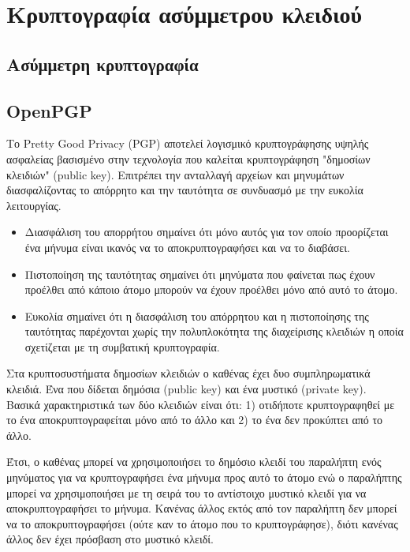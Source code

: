 \section{Κρυπτογραφία ασύμμετρου κλειδιού}

\subsection{Ασύμμετρη κρυπτογραφία}


\subsection{OpenPGP}

Το Pretty Good Privacy (PGP) αποτελεί λογισμικό κρυπτογράφησης υψηλής ασφαλείας βασισμένο στην τεχνολογία που καλείται κρυπτογράφηση "δημοσίων κλειδιών" (public key). Επιτρέπει την ανταλλαγή αρχείων και μηνυμάτων διασφαλίζοντας το απόρρητο και την ταυτότητα σε συνδυασμό με την ευκολία λειτουργίας.

\begin{itemize}
    \item Διασφάλιση του απορρήτου σημαίνει ότι μόνο αυτός για τον οποίο προορίζεται ένα μήνυμα είναι ικανός να το αποκρυπτογραφήσει και να το διαβάσει.
    \item Πιστοποίηση της ταυτότητας σημαίνει ότι μηνύματα που φαίνεται πως έχουν προέλθει από κάποιο άτομο μπορούν να έχουν προέλθει μόνο από αυτό το άτομο.
    \item Ευκολία σημαίνει ότι η διασφάλιση του απόρρητου και η πιστοποίησης της ταυτότητας παρέχονται χωρίς την πολυπλοκότητα της διαχείρισης κλειδιών η οποία σχετίζεται με τη συμβατική κρυπτογραφία.
\end{itemize}

Στα κρυπτοσυστήματα δημοσίων κλειδιών ο καθένας έχει δυο συμπληρωματικά κλειδιά. Ένα που δίδεται δημόσια (public key) και ένα μυστικό (private key). Βασικά χαρακτηριστικά των δύο κλειδιών είναι ότι: 1) οτιδήποτε κρυπτογραφηθεί με το ένα αποκρυπτογραφείται μόνο από το άλλο και 2) το ένα δεν προκύπτει από το άλλο.


Έτσι, ο καθένας μπορεί να χρησιμοποιήσει το δημόσιο κλειδί του παραλήπτη ενός μηνύματος για να κρυπτογραφήσει ένα μήνυμα προς αυτό το άτομο ενώ ο παραλήπτης μπορεί να χρησιμοποιήσει με τη σειρά του το αντίστοιχο μυστικό κλειδί για να αποκρυπτογραφήσει το μήνυμα. Κανένας άλλος εκτός από τον παραλήπτη δεν μπορεί να το αποκρυπτογραφήσει (ούτε καν το άτομο που το κρυπτογράφησε), διότι κανένας άλλος δεν έχει πρόσβαση στο μυστικό κλειδί.

